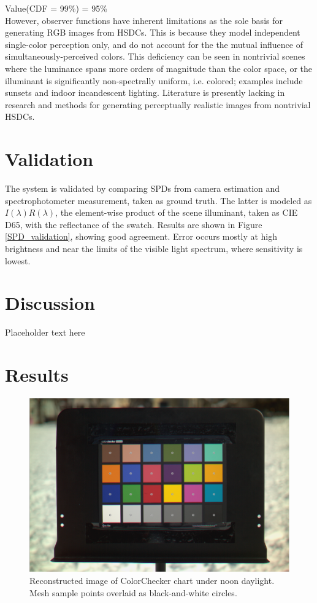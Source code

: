 \documentclass[twocolumn,10pt]{asme2ej}
\begin{document}
Value(CDF = 99\%) = 95\%\\

However, observer functions have inherent limitations as the sole basis for generating RGB images from HSDCs. This is because they model independent single-color perception only, and do not account for the the mutual influence of simultaneously-perceived colors. This deficiency can be seen in nontrivial scenes where the luminance spans more orders of magnitude than the color space, or the illuminant is significantly non-spectrally uniform, i.e. colored; examples include sunsets and indoor incandescent lighting. Literature is presently lacking in research and methods for generating perceptually realistic images from nontrivial HSDCs.

\section{Validation}

\noindent The system is validated by comparing SPDs from camera estimation and spectrophotometer measurement, taken as ground truth. The latter is modeled as $I(\lambda)R(\lambda)$, the element-wise product of the scene illuminant, taken as CIE D65, with the reflectance of the swatch. Results are shown in Figure \ref{SPD_validation}, showing good agreement. Error occurs mostly at high brightness and near the limits of the visible light spectrum, where sensitivity is lowest.

\section{Discussion}

Placeholder text here

\clearpage

\onecolumn

\section{Results}

\begin{figure}[H]
\begin{centering}
  \includegraphics[height=0.45\linewidth]{colorchecker_mesh.png}
  \caption{Reconstructed image of ColorChecker chart under noon daylight. Mesh sample points overlaid as black-and-white circles.}
  \label{colorchecker_mesh}
  \end{centering}
\end{figure}
\end{document}
